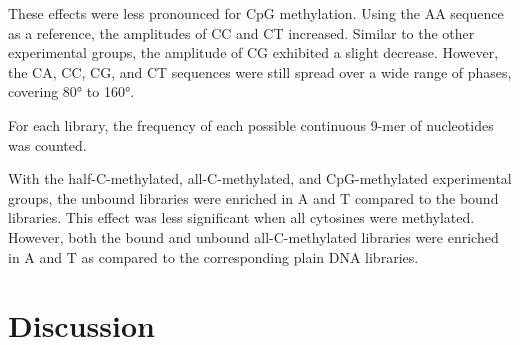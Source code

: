 \documentclass[parskip=full, numbers=noenddot]{scrreprt}
\begin{document}
These effects were less pronounced for CpG methylation. %
Using the AA sequence as a reference, the amplitudes of CC and CT increased.  Similar to the other experimental groups, the amplitude of CG exhibited a slight decrease.  However, the CA, CC, CG, and CT sequences were still spread over a wide range of phases, covering \ang{80} to \ang{160}.

For each library, the frequency of each possible continuous 9-mer of nucleotides was counted.

With the half-C-methylated, all-C-methylated, and CpG-methylated experimental groups, the unbound libraries were enriched in A and T compared to the bound libraries.  This effect was less significant when all cytosines were methylated.  However, both the bound and unbound all-C-methylated libraries were enriched in A and T as compared to the corresponding plain DNA libraries. %

\section{Discussion}
\label{sec:emsaselex_discussion}




\end{document}
